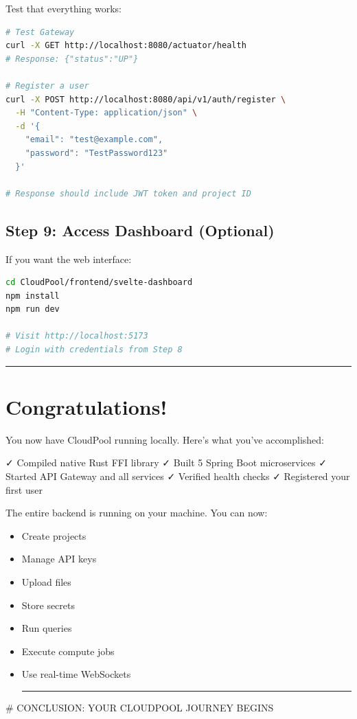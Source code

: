 \documentclass[11pt,a4paper]{report}
\begin{document}
Test that everything works:

\begin{lstlisting}[language=bash]
# Test Gateway
curl -X GET http://localhost:8080/actuator/health
# Response: {"status":"UP"}

# Register a user
curl -X POST http://localhost:8080/api/v1/auth/register \
  -H "Content-Type: application/json" \
  -d '{
    "email": "test@example.com",
    "password": "TestPassword123"
  }'

# Response should include JWT token and project ID
\end{lstlisting}


\section{Step 9: Access Dashboard (Optional)}


If you want the web interface:

\begin{lstlisting}[language=bash]
cd CloudPool/frontend/svelte-dashboard
npm install
npm run dev

# Visit http://localhost:5173
# Login with credentials from Step 8
\end{lstlisting}


\vfill\hrule\vfill



\chapter{Congratulations! 🎉}


You now have CloudPool running locally. Here's what you've accomplished:

✓ Compiled native Rust FFI library
✓ Built 5 Spring Boot microservices
✓ Started API Gateway and all services
✓ Verified health checks
✓ Registered your first user

The entire backend is running on your machine. You can now:

\begin{itemize}
\item Create projects
\item Manage API keys
\item Upload files
\item Store secrets
\item Run queries
\item Execute compute jobs
\item Use real-time WebSockets


\vfill\hrule\vfill


\end{itemize}
\# CONCLUSION: YOUR CLOUDPOOL JOURNEY BEGINS
\end{document}
